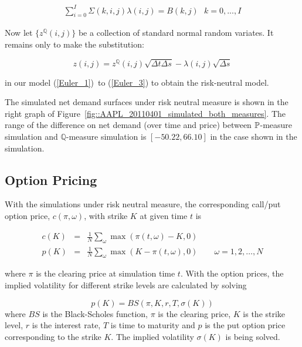 \documentclass{article}
\begin{document}
\begin{eqnarray}  \label{eqn::market_price_risk_equation}
\sum_{i=0}^{I}\Sigma(k,i,j)\lambda (i,j)=B(k,j)\text{ \ \ \ }k=0,...,I
\end{eqnarray}

Now let $\{z^{\mathbb{Q}}(i,j)\}$ be a collection of standard normal random
variates. It remains only to make the substitution:

\begin{equation*}
z(i,j)=z^{\mathbb{Q}}(i,j)\sqrt{\Delta t\Delta s}-\lambda (i,j)\sqrt{\Delta s%
}
\end{equation*}

in our model (\ref{Euler_1})\ to (\ref{Euler_3}) to obtain the risk-neutral
model.

The simulated net demand surfaces under risk neutral measure is shown in the
right graph of Figure~\ref{fig::AAPL_20110401_simulated_both_measures}. The
range of the difference on net demand (over time and price) between $\mathbb{%
P}$-measure simulation and $\mathbb{Q}$-measure simulation is $%
[-50.22,66.10] $ in the case shown in the simulation.

\subsection{Option Pricing}

With the simulations under risk neutral measure, the corresponding call/put
option price, $c(\pi, \omega)$, with strike $K$ at given time $t$ is

\begin{eqnarray*}
c(K) &=& \frac{1}{N} \sum_{\omega} \max\left(\pi(t,\omega)-K,0\right) \\
p(K) &=& \frac{1}{N} \sum_{\omega} \max\left(K - \pi(t,\omega),0\right)
\qquad \omega = 1,2,\ldots,N
\end{eqnarray*}

where $\pi$ is the clearing price at simulation time $t$. With the option
prices, the implied volatility for different strike levels are calculated by
solving

\begin{equation*}
p(K)=BS(\pi ,K,r,T,\sigma (K))
\end{equation*}%
where $BS$ is the Black-Scholes function, $\pi $ is the clearing price, $K$
is the strike level, $r$ is the interest rate, $T$ is time to maturity and $%
p $ is the put option price corresponding to the strike $K$. The implied
volatility $\sigma (K)$ is being solved.
\end{document}
